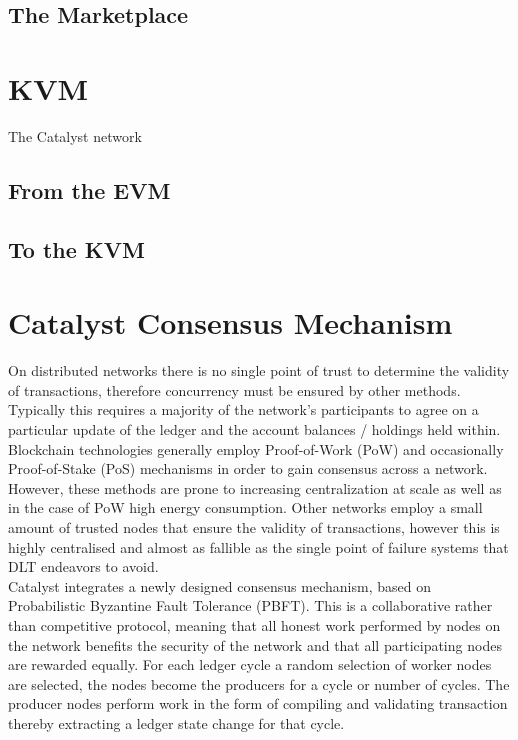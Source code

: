 \documentclass{article}
\begin{document}
\subsection{The Marketplace}

\section{KVM}

The Catalyst network \cite{KVM}

\subsection{From the EVM}

\subsection{To the KVM}



\section{Catalyst Consensus Mechanism} 

On distributed networks there is no single point of trust to determine the validity of transactions, therefore concurrency must be ensured by other methods. Typically this requires a majority of the network's participants to agree on a particular update of the ledger and the account balances / holdings held within. Blockchain technologies generally employ Proof-of-Work (PoW) and occasionally Proof-of-Stake (PoS) mechanisms in order to gain consensus across a network. However, these methods are prone to increasing centralization at scale as well as in the case of PoW high energy consumption. Other networks employ a small amount of trusted nodes that ensure the validity of transactions, however this is highly centralised and almost as fallible as the single point of failure systems that DLT endeavors to avoid. \\

Catalyst integrates a newly designed consensus mechanism, based on Probabilistic Byzantine Fault Tolerance (PBFT).  This is a collaborative rather than competitive protocol, meaning that all honest work performed by nodes on the network benefits the security of the network and that all participating nodes are rewarded equally. For each ledger cycle a random selection of worker nodes are selected, the nodes become the producers for a cycle or number of cycles. The producer nodes perform work in the form of compiling and validating transaction thereby extracting a ledger state change for that cycle. \\
\end{document}
